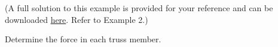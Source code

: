 \documentclass[9pt, xcolor={svgnames, x11names},professionalfonts]{beamer}
\def\scale{1}
\begin{document}

\begin{frame}%

	\begin{myexam}{}{}
		\def\scale{0.9}
		\centering
		

	\end{myexam}

\end{frame}



\begin{frame}%

	\begin{myexam}{}{}
		\def\scale{1}
		\centering
		


		{\scriptsize (A full solution to this example is provided for your reference and can be downloaded  \href{https://eduk8r.org/statics/sxs/07MoJSxS.pdf}{here}. \lb Refer to Example 2.)}

	\end{myexam}

\end{frame}


\begin{frame}%

	\begin{myexam}{}{}
		\def\scale{0.75}
		\centering
		
		\parb
		Determine the force in each truss member.
	\end{myexam}

\end{frame}

\end{document}

